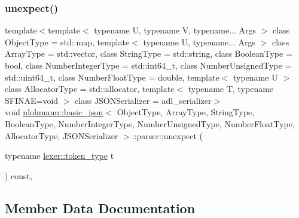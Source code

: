 \subsubsection{\texorpdfstring{unexpect()}{unexpect()}}
{\footnotesize\ttfamily template$<$template$<$ typename U, typename V, typename... Args $>$ class Object\+Type = std\+::map, template$<$ typename U, typename... Args $>$ class Array\+Type = std\+::vector, class String\+Type  = std\+::string, class Boolean\+Type  = bool, class Number\+Integer\+Type  = std\+::int64\+\_\+t, class Number\+Unsigned\+Type  = std\+::uint64\+\_\+t, class Number\+Float\+Type  = double, template$<$ typename U $>$ class Allocator\+Type = std\+::allocator, template$<$ typename T, typename S\+F\+I\+N\+A\+E=void $>$ class J\+S\+O\+N\+Serializer = adl\+\_\+serializer$>$ \\
void \hyperlink{classnlohmann_1_1basic__json}{nlohmann\+::basic\+\_\+json}$<$ Object\+Type, Array\+Type, String\+Type, Boolean\+Type, Number\+Integer\+Type, Number\+Unsigned\+Type, Number\+Float\+Type, Allocator\+Type, J\+S\+O\+N\+Serializer $>$\+::parser\+::unexpect (\begin{DoxyParamCaption}\item[{typename \hyperlink{classnlohmann_1_1basic__json_1_1lexer_a96887d6cd131e3d3a85a9d71fbdbcdf7}{lexer\+::token\+\_\+type}}]{t }\end{DoxyParamCaption}) const\hspace{0.3cm}{\ttfamily [inline]}, {\ttfamily [private]}}



\subsection{Member Data Documentation}
\mbox{\label{classnlohmann_1_1basic__json_1_1parser_a8ea1870aa64698f46b777e2863fde801}} 
